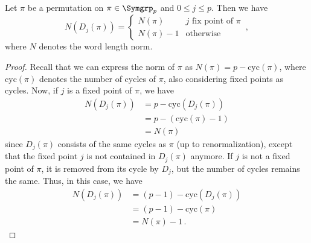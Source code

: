 \begin{lem}
Let $\pi$ be a permutation on $\pi \in \Symgrp_p$ and $0 \le j \le p$.
Then we have
\[ 
    N(D_j(\pi)) =
        \begin{cases}
            N(\pi)      & j \text{ fix point of } \pi \\
            N(\pi) - 1  & \text{otherwise}
        \end{cases}\,,
\] 
where $N$ denotes the word length norm.

\begin{proof}
Recall that we can express the norm of $\pi$ as $N(\pi) = p - \mathrm{cyc}(\pi)$, 
where $\mathrm{cyc}(\pi)$ denotes the number of cycles of $\pi$, also considering fixed points as cycles. 
Now, if $j$ is a fixed point of $\pi$, we have 
\begin{align*}
N(D_j(\pi))&= p - \mathrm{cyc}(D_j(\pi)) \\
           &= p - (\mathrm{cyc}(\pi) - 1) \\
           &= N(\pi)
\end{align*}
since $D_j(\pi)$ consists of the same cycles as $\pi$ (up to renormalization), 
except that the fixed point $j$ is not contained in $D_j(\pi)$ anymore.
If $j$ is not a fixed point of $\pi$, it is removed from its cycle by $D_j$, 
but the number of cycles remains the same. 
Thus, in this case, we have
\begin{align*}
N(D_j(\pi)) &= (p - 1) - \mathrm{cyc}(D_j(\pi)) \\
           &= (p - 1) - \mathrm{cyc}(\pi) \\
           &= N(\pi) - 1\,.
\end{align*}
\end{proof}
\end{lem}